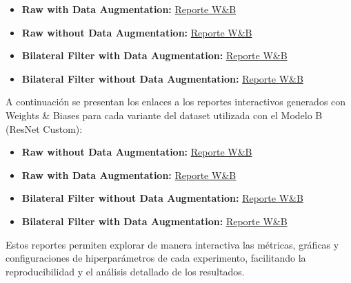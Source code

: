 \documentclass[conference]{IEEEtran}
\begin{document}
\begin{itemize}
    \item \textbf{Raw with Data Augmentation:} \href{https://api.wandb.ai/links/bitfalt-itcr/os9hfdn0}{Reporte W\&B}
    \item \textbf{Raw without Data Augmentation:} \href{https://wandb.ai/bitfalt-itcr/raw-without-data-augmentation-hyperparameter-tuning/reports/Raw-without-Data-Augmentation-Training--VmlldzoxMjc5OTExNg?accessToken=ezll5ikzm6trsqjl6qhbm4lpbkrzh15ih8mdsbg1gsmo9ghrrelz0a1482xkeazf}{Reporte W\&B}
    \item \textbf{Bilateral Filter with Data Augmentation:} \href{https://api.wandb.ai/links/bitfalt-itcr/w5mpcfor}{Reporte W\&B}
    \item \textbf{Bilateral Filter without Data Augmentation:} \href{https://wandb.ai/bitfalt-itcr/bilateral-without-data-augmentation-hyperparameter-tuning/reports/Bilateral-Filter-without-Data-Augmentation-Training--VmlldzoxMjc5OTI0OA?accessToken=3jr1rjxuqs2wf2tieb6wewuee0nf6zp9pjrg0vje58npgrsvatkgbemlxdxqobma}{Reporte W\&B}
\end{itemize}

A continuación se presentan los enlaces a los reportes interactivos generados con Weights \& Biases para cada variante del dataset utilizada con el Modelo B (ResNet Custom):

\begin{itemize}
    \item \textbf{Raw without Data Augmentation:} \href{https://api.wandb.ai/links/bitfalt-itcr/mdkkbsk1}{Reporte W\&B}
    \item \textbf{Raw with Data Augmentation:} \href{https://api.wandb.ai/links/bitfalt-itcr/dc9nvcy7}{Reporte W\&B}
    \item \textbf{Bilateral Filter without Data Augmentation:} \href{https://api.wandb.ai/links/bitfalt-itcr/9i0hutcl}{Reporte W\&B}
    \item \textbf{Bilateral Filter with Data Augmentation:} \href{https://api.wandb.ai/links/bitfalt-itcr/3fxajakc}{Reporte W\&B}
\end{itemize}

Estos reportes permiten explorar de manera interactiva las métricas, gráficas y configuraciones de hiperparámetros de cada experimento, facilitando la reproducibilidad y el análisis detallado de los resultados.
\end{document}
